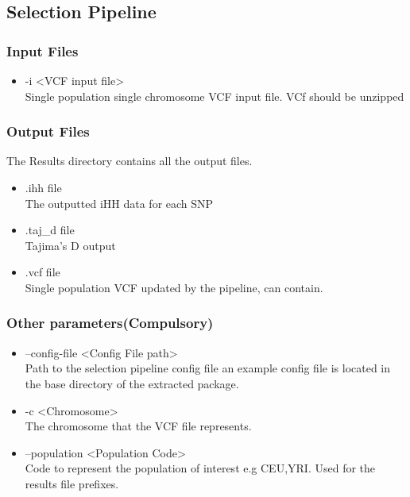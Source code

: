 \documentclass[a4paper,10pt]{article}
\begin{document}
                             \subsection{Selection Pipeline}
                             \subsubsection{Input Files}
                             \begin{itemize}
                             \item -i <VCF input file>\\
                             Single population single chromosome VCF input file. VCf should be unzipped
                             \end{itemize}
                             \subsubsection{Output Files}
                             The Results directory contains all the output files.
                             \begin{itemize}
                             \item .ihh file\\
                             The outputted iHH data for each SNP
                             \item .taj\_d file\\
                             Tajima's D output
                             \item .vcf file\\
                             Single population VCF updated by the pipeline, can contain.
                             \end{itemize}
                             \subsubsection{Other parameters(Compulsory)}
                             \begin{itemize}
                             \item --config-file <Config File path>\\
                             Path to the selection pipeline config file an example config file is located in the base directory of the extracted package.
                             \item -c <Chromosome>\\
                             The chromosome that the VCF file represents.
                             \item --population <Population Code>\\
                             Code to represent the population of interest e.g CEU,YRI. Used for the results file prefixes.

                             \end{itemize}
\end{document}
